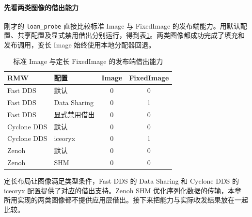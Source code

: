 \paragraph*{先看两类图像的借出能力}
刚才的 \texttt{loan\_probe} 直接比较标准 Image 与 FixedImage 的发布端能力。用默认配置、共享配置及显式禁用借出分别运行，得到表\ref{tab:ros2-image-loan-probe}。两类图像都成功完成了填充和发布调用，变长 Image 始终使用本地分配器回退。

\begin{table}[htbp]
\centering
\small
\caption{标准 Image 与定长 FixedImage 的发布端借出能力}
\label{tab:ros2-image-loan-probe}
\begin{tabular}{llcc}
\toprule
RMW & 配置 & Image & FixedImage\\
\midrule
Fast DDS & 默认 & 0 & 0\\
Fast DDS & Data Sharing & 0 & 1\\
Fast DDS & 显式禁用借出 & 0 & 0\\
\midrule
Cyclone DDS & 默认 & 0 & 0\\
Cyclone DDS & iceoryx & 0 & 1\\
\midrule
Zenoh & 默认 & 0 & 0\\
Zenoh & SHM & 0 & 0\\
\bottomrule
\end{tabular}
\end{table}
定长布局让图像满足类型条件，Fast DDS 的 Data Sharing 和 Cyclone DDS 的 iceoryx 配置提供了对应的借出支持。Zenoh SHM 优化序列化数据的传输，本章所用实现的两类图像都不提供应用层借出。接下来把能力与实际收发结果放在一起比较。

